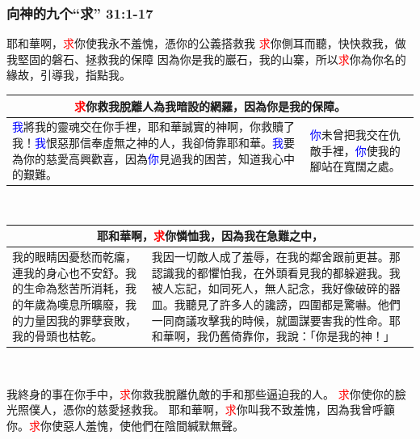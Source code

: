\subsubsection{向神的九个“求” 31:1-17}
耶和華啊，\textcolor{red}{求}你使我永不羞愧，憑你的公義搭救我 
\textcolor{red}{求}你側耳而聽，快快救我，做我堅固的磐石、拯救我的保障
因為你是我的巖石，我的山寨，所以\textcolor{red}{求}你為你名的緣故，引導我，指點我。
\begin{table}[H]
\centering
\begin{tabular}{p{}|p{3.00cm}}\hline\hline
\multicolumn{2}{c}{\textcolor{red}{求}你救我脫離人為我暗設的網羅，因為你是我的保障。}\\\hline
\textcolor{blue}{我}將我的靈魂交在你手裡，耶和華誠實的神啊，你救贖了我！\textcolor{blue}{我}恨惡那信奉虛無之神的人，我卻倚靠耶和華。\textcolor{blue}{我}要為你的慈愛高興歡喜，因為\textcolor{blue}{你}見過我的困苦，知道我心中的艱難。
&\textcolor{blue}{你}未曾把我交在仇敵手裡，\textcolor{blue}{你}使我的腳站在寬闊之處。\\\hline
\end{tabular}
\end{table} 
\begin{table}[H]
\centering
\begin{tabular}{p{5.5cm}|p{11.50cm}}\hline\hline
\multicolumn{2}{c}{耶和華啊，\textcolor{red}{求}你憐恤我，因為我在急難之中，}\\\hline
我的眼睛因憂愁而乾癟，連我的身心也不安舒。我的生命為愁苦所消耗，我的年歲為嘆息所曠廢，我的力量因我的罪孽衰敗，我的骨頭也枯乾。&我因一切敵人成了羞辱，在我的鄰舍跟前更甚。那認識我的都懼怕我，在外頭看見我的都躲避我。我被人忘記，如同死人，無人記念，我好像破碎的器皿。我聽見了許多人的讒謗，四圍都是驚嚇。他們一同商議攻擊我的時候，就圖謀要害我的性命。耶和華啊，我仍舊倚靠你，我說：「你是我的神！」\\\hline
\end{tabular}
\end{table} 

我終身的事在你手中，\textcolor{red}{求}你救我脫離仇敵的手和那些逼迫我的人。
\textcolor{red}{求}你使你的臉光照僕人，憑你的慈愛拯救我。
耶和華啊，\textcolor{red}{求}你叫我不致羞愧，因為我曾呼籲你。\textcolor{red}{求}你使惡人羞愧，使他們在陰間緘默無聲。


